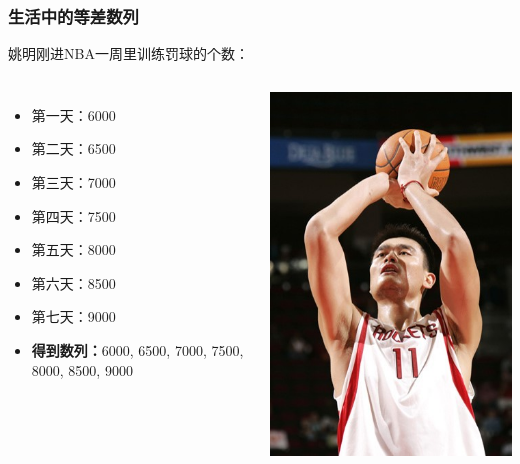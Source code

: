 \documentclass[12pt]{beamer}
\begin{document}
	\begin{frame}[fragile]\frametitle{生活中的等差数列}

		姚明刚进NBA一周里训练罚球的个数：    
		\begin{columns}
				\begin{itemize}[<+- | +->]
					\item 第一天：6000
					\item 第二天：6500
					\item 第三天：7000
					\item 第四天：7500
					\item 第五天：8000
					\item 第六天：8500
					\item 第七天：9000
					\item \textbf{得到数列：}6000, 6500, 7000, 7500, 8000, 8500, 9000
				\end{itemize}
				\includegraphics[width=\textwidth]{ap2.jpg}		
		\end{columns}
		
	\end{frame}
\end{document}
